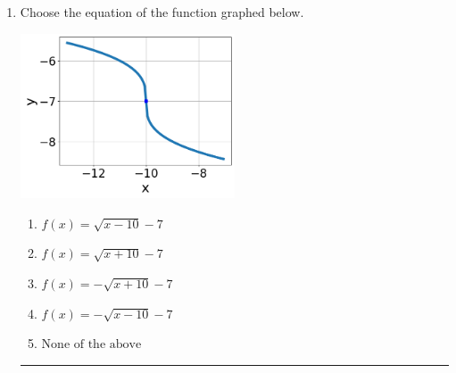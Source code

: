 \documentclass[14pt]{extbook}
\newcommand{\litem}[1]{\item#1\hspace*{-1cm}\rule{\textwidth}{0.4pt}}
\begin{document}
\begin{enumerate}
{\begin{enumerate}[label=\Alph*.]
\end{enumerate} }
\litem{
Choose the equation of the function graphed below.
\begin{center}
    \includegraphics[width=0.5\textwidth]{../Figures/radicalGraphToEquationA.png}
\end{center}
\begin{enumerate}[label=\Alph*.]
\item \( f(x) = \sqrt{x - 10} - 7 \)
\item \( f(x) = \sqrt{x + 10} - 7 \)
\item \( f(x) = - \sqrt{x + 10} - 7 \)
\item \( f(x) = - \sqrt{x - 10} - 7 \)
\item \( \text{None of the above} \)

\end{enumerate} }
\end{enumerate}
\end{document}
